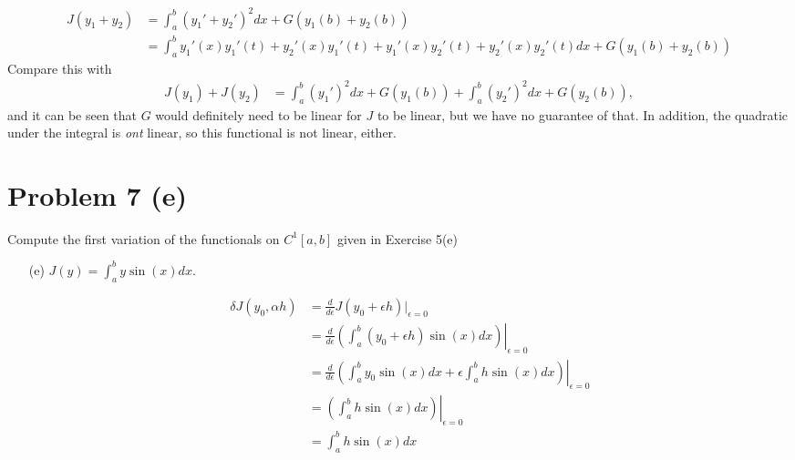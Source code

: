 \documentclass{article}
\begin{document}
\begin{enumerate}[label={(\alph*)}]
  \begin{equation*}
    \begin{split}
      J(y_1 + y_2) &= \int_a^b (y_1' + y_2')^2 dx + G(y_1(b) + y_2(b))\\
      & = \int_a^b y_1'(x)y_1'(t)  + y_2'(x)y_1'(t)
        + y_1'(x)y_2'(t) + y_2'(x)y_2'(t) dx + G(y_1(b) + y_2(b))
    \end{split}
  \end{equation*}
Compare this with 
\begin{equation*}
  \begin{split}
    J(y_1) + J(y_2) & = \int_a^b (y_1')^2 dx + G(y_1(b)) + \int_a^b (y_2')^2 dx + G(y_2(b)),
  \end{split}
\end{equation*}
and it can be seen that $G$ would definitely need to be linear for
$J$ to be linear, but we have no guarantee of that.  In addition, the
quadratic under the integral is \emph{ont} linear, so this functional
is not linear, either.
\end{enumerate}


\section*{Problem 7 (e)}
Compute the first variation of the functionals on $C^1[a,b]$ given in
Exercise 5(e)

\begin{enumerate}
\item[(e)] $ J(y) = \int_a^b y \sin(x) dx$.
\item[]\begin{equation*}
  \begin{split}
    \delta J(y_0, \alpha h) 
    &= \frac{d}{d\epsilon}J(y_0 + \epsilon h)|_{\epsilon
      =0}\\ 
    & = \frac{d}{d\epsilon}\left.\left(\int_a^b (y_0 + \epsilon h)
        \sin(x) dx\right)\right|_{\epsilon = 0}\\
    & =  \frac{d}{d\epsilon}\left.\left( 
      \int_a^b y_0 \sin(x) dx + 
      \epsilon \int_a^b  h \sin(x) dx\right)
      \right|_{\epsilon = 0}\\
    & =  \left.\left(\int_a^b  h \sin(x) dx \right)\right|_{\epsilon =
      0}\\
    & =  \int_a^b h \sin(x) dx\\
  \end{split}
\end{equation*}

\end{enumerate}
\end{document}
